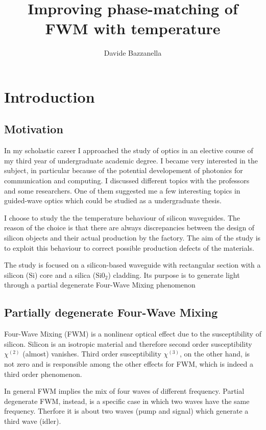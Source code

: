 \documentclass[12pt,a4paper,twocolumn,twoside]{article}
\author{Davide Bazzanella}
\title{Improving phase-matching of FWM with temperature}
\begin{document}

\cleardoublepage 
\tableofcontents

\cleardoublepage 
\section{Introduction}
\subsection{Motivation}
In my scholastic career I approached the study of optics in an elective course of my third year of undergraduate academic degree.
I became very interested in the subject, in particular because of the potential developement of photonics for communication and computing.
I discussed different topics with the professors and some researchers.
One of them suggested me a few interesting topics in guided-wave optics which could be studied as a undergraduate thesis.

I choose to study the the temperature behaviour of silicon waveguides.
The reason of the choice is that there are always discrepancies between the design of silicon objects and their actual production by the factory.
The aim of the study is to exploit this behaviour to correct possible production defects of the materials.

The study is focused on a silicon-based waveguide with rectangular section with a silicon ($\mathrm{Si}$) core and a silica ($\mathrm{Si0}_2$) cladding.
Its purpose is to generate light through a partial degenerate Four-Wave Mixing phenomenon

\subsection{Partially degenerate Four-Wave Mixing}
Four-Wave Mixing (FWM) is a nonlinear optical effect due to the susceptibility of silicon.
Silicon is an isotropic material and therefore second order susceptibility $\chi^{(2)}$ (almost) vanishes.
Third order susceptibility $\chi^{(3)}$, on the other hand, is not zero and is responsible among the other effects for FWM, which is indeed a third order phenomenon.

In general FWM implies the mix of four waves of different frequency.
Partial degenerate FWM, instead, is a specific case in which two waves have the same frequency.
Therfore it is about two waves (pump and signal) which generate a third wave (idler).
\end{document}

